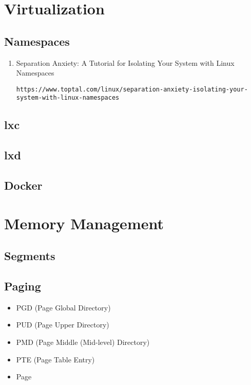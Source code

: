 \documentclass[12pt,a4paper]{article}
\begin{document}
\section{Virtualization}

\subsection{Namespaces}

\begin{enumerate}

\item Separation Anxiety: A Tutorial for Isolating Your System with Linux Namespaces

	\texttt{https://www.toptal.com/linux/separation-anxiety-isolating-your-system-with-linux-namespaces}

\end{enumerate}

\subsection{lxc}

\subsection{lxd}

\subsection{Docker}

\section{Memory Management}

\subsection{Segments}

\subsection{Paging}

\begin{itemize}
\item PGD (Page Global Directory)
\item PUD (Page Upper Directory)
\item PMD (Page Middle (Mid-level) Directory)
\item PTE (Page Table Entry)
\item Page
\end{itemize}
\end{document}
